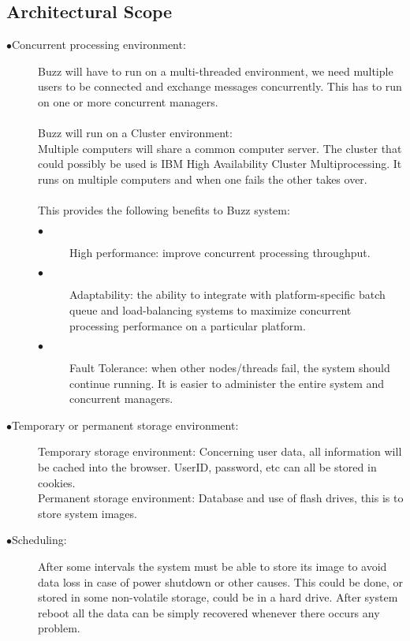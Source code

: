 \documentclass[12pt]{article}
\begin{document}
\subsection{Architectural Scope}
\begin{description}
\item[$\bullet$Concurrent processing environment:]

Buzz will have to run on a multi-threaded environment, we need multiple users to be connected and exchange messages concurrently. This has to run on one or more concurrent managers.\\\\
Buzz will run on a Cluster environment:\\
Multiple computers will share a common computer server. The cluster that could possibly be used is IBM High Availability Cluster Multiprocessing. It runs on multiple computers and when one fails the other takes over.\\\\
This provides the following benefits to Buzz system:
\begin{description}
\item[$\bullet$] High performance: improve concurrent processing throughput.
\item[$\bullet$]Adaptability: the ability to integrate with platform-specific batch queue and load-balancing systems to maximize concurrent processing performance on a particular platform.
\item[$\bullet$] Fault Tolerance: when other nodes/threads fail, the system should continue running. It is easier to administer the entire system and concurrent managers.\\
\end{description}

\item[$\bullet$Temporary or permanent storage environment:]

Temporary storage environment: Concerning user data, all information will be cached into the browser. UserID, password, etc can all be stored in cookies.\\
Permanent storage environment: Database and use of flash drives, this is to store system images.\\

\item[$\bullet$Scheduling:]

After some intervals the system must be able to store its image to avoid data loss in case of power shutdown or other causes. This could be done, or stored in some non-volatile storage, could be in a hard drive. After system reboot all the data can be simply recovered whenever there occurs any problem.\\


\end{description}
\end{document}
